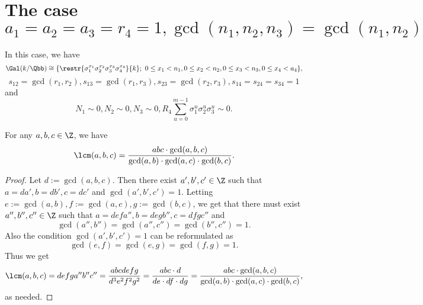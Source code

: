 \section{The case $a_1\!=\!a_2\!=\!a_3\!=\!r_4\!=\!1, \gcd(n_1,n_2,n_3)\!=\!\gcd(n_1,n_2)$}
In this case, we have
$$\Gal(k/\Qbb)\cong
 \{\restr{\sigma_1^{x_1}\sigma_2^{x_2}\sigma_3^{x_3}\sigma_4^{x_4}}{k};~  0\leq x_1<n_1, 0\leq x_2<n_2, 0\leq x_3<n_3,0\leq x_4<a_4\},$$
  $$s_{12}=\gcd(r_1,r_2), s_{13}=\gcd(r_1,r_3), s_{23}=\gcd(r_2,r_3), s_{14}=s_{24}=s_{34}=1$$
 and
$$N_1\sim 0, N_2\sim 0, N_3 \sim 0, R_4 \sum_{u=0}^{m-1}\sigma_1^{u}\sigma_2^{u}\sigma_3^{u} \sim 0.$$

\begin{lemma}\label{LCM3}
For any $a,b,c\in\Z$, we have $$\lcm(a,b,c)=\frac{abc\cdot \gcd(a,b,c)}{\gcd(a,b)\cdot \gcd(a,c)\cdot\gcd(b,c)}.$$
\end{lemma}
\begin{proof}
Let $d:=\gcd(a,b,c)$. Then there exist $a',b',c'\in\Z$ such that $a=da', b=db', c=dc'$ and $\gcd(a',b',c')=1$. Letting $e:=\gcd(a,b), f:=\gcd(a,c), g:=\gcd(b,c)$, we get that there must exist $a'',b'',c''\in\Z$ such that $a=defa'', b=degb'', c=dfgc''$ and $$\gcd(a'',b'')=\gcd(a'',c'')=\gcd(b'',c'')=1.$$ Also the condition $\gcd(a',b',c')=1$ can be reformulated as  $$\gcd(e,f)=\gcd(e,g)=\gcd(f,g)=1.$$
Thus we get $$\lcm(a,b,c)=defga''b''c''=\frac{abcdefg}{d^3e^2f^2g^2}=\frac{abc\cdot d}{de\cdot df\cdot dg}=\frac{abc\cdot \gcd(a,b,c)}{\gcd(a,b)\cdot \gcd(a,c)\cdot\gcd(b,c)},$$
as needed.
\end{proof}


